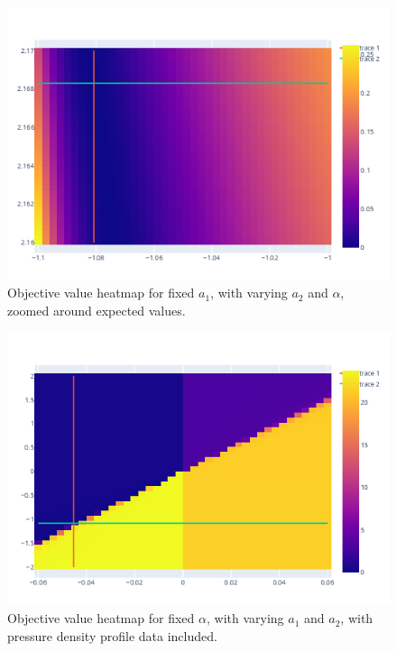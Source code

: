 \begin{figure}[h!]
    \centering
    \includegraphics[scale=0.7]{imgs/c4/heat-3-zoomed-current-only.png}
    \caption{Objective value heatmap for fixed $a_1$, with varying 
    $a_2$ and $\alpha$, zoomed around expected values.}
    \label{heat-3-zoomed}
\end{figure}

\begin{figure}[h!]
    \centering
    \includegraphics[scale=0.7]{imgs/c4/heat-1-with-pressure.png}
    \caption{Objective value heatmap for fixed $\alpha$, with varying 
    $a_1$ and $a_2$, with pressure density profile data included.}
    \label{heat-1-both}
\end{figure}

